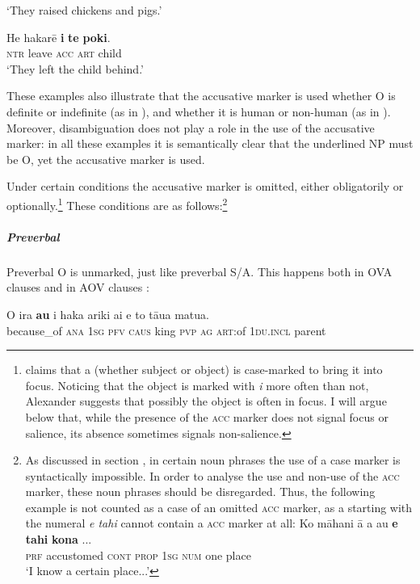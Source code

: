 {\glt 
‘They raised chickens and pigs.’ \textstyleExampleref{[R229.112]} 
\z

\ea\label{ex:8.27}
\gll He hakarē \textbf{i} \textbf{te} \textbf{poki}. \\
\textsc{ntr} leave \textsc{acc} \textsc{art} child \\

\glt
‘They left the child behind.’ \textstyleExampleref{[R532-07.057]}
\z

These examples also illustrate that the accusative marker is used whether O is definite or indefinite (as in ), and whether it is human or non-human (as in ). Moreover, disambiguation does not play a role in the use of the accusative marker: in all these examples it is semantically clear that the underlined NP must be O, yet the accusative marker is used.

Under certain conditions the accusative marker is omitted, either obligatorily or optionally.\footnote{\label{fn:404}\citet[165]{Alexander1981Minnesota} claims that a  (whether subject or object) is case-marked to bring it into focus. Noticing that the object is marked with \textit{i} more often than not, Alexander suggests that possibly the object is often in focus. I will argue below that, while the presence of the \textsc{acc} marker does not signal focus or salience, its absence sometimes signals non-salience.} These conditions are as follows:\footnote{\label{fn:405}As discussed in section , in certain noun phrases the use of a case marker is syntactically impossible. In order to analyse the use and non-use of the \textsc{acc} marker, these noun phrases should be disregarded. Thus, the following example is not counted as a case of an omitted \textsc{acc} marker, as a  starting with the numeral \textit{e tahi} cannot contain a \textsc{acc} marker at all:
\ea
\gll
Ko māhani {\ꞌ}ā a au \textbf{e} \textbf{tahi} \textbf{kona} ...\\
  \textsc{prf} accustomed \textsc{cont} \textsc{prop} \textsc{1sg} \textsc{num} one place\\
  \glt 
  ‘I know a certain place...’ \textstyleExampleref{[R296.001]}\z }} 
\subparagraph{Preverbal} Preverbal O is unmarked, just like preverbal S/A. This happens both in OVA clauses  and in AOV clauses :

\ea\label{ex:8.28}
\gll {\ꞌ}O ira \textbf{au} i haka {\ꞌ}ariki ai e to tāua matu{\ꞌ}a.\\
because\_of \textsc{ana} \textsc{1sg} \textsc{pfv} \textsc{caus} king \textsc{pvp} \textsc{ag} \textsc{art}:of \textsc{1du.incl} parent\\

